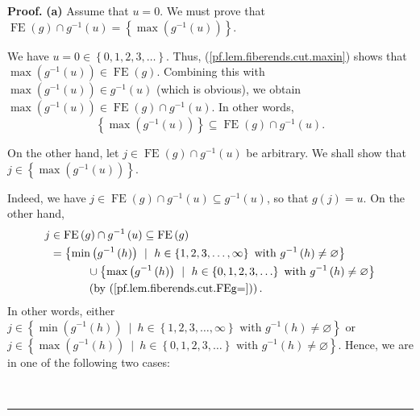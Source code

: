 \documentclass[numbers=enddot,12pt,final,onecolumn,notitlepage]{scrartcl}%
\theoremstyle{definition}
\newenvironment{proof}[1][Proof]{\noindent\textbf{#1.} }{\ \rule{0.5em}{0.5em}}
\newenvironment{verlong}{}{}
\begin{document}
\begin{verlong}
\begin{proof}
\textbf{(a)} Assume that $u=0$. We must prove that $\operatorname*{FE}\left(
g\right)  \cap g^{-1}\left(  u\right)  =\left\{  \max\left(  g^{-1}\left(
u\right)  \right)  \right\}  $.

We have $u=0\in\left\{  0,1,2,3,\ldots\right\}  $. Thus,
(\ref{pf.lem.fiberends.cut.maxin}) shows that $\max\left(  g^{-1}\left(
u\right)  \right)  \in\operatorname*{FE}\left(  g\right)  $. Combining this
with $\max\left(  g^{-1}\left(  u\right)  \right)  \in g^{-1}\left(  u\right)
$ (which is obvious), we obtain $\max\left(  g^{-1}\left(  u\right)  \right)
\in\operatorname*{FE}\left(  g\right)  \cap g^{-1}\left(  u\right)  $. In
other words,%
\begin{equation}
\left\{  \max\left(  g^{-1}\left(  u\right)  \right)  \right\}  \subseteq
\operatorname*{FE}\left(  g\right)  \cap g^{-1}\left(  u\right)  .
\label{pf.lem.fiberends.cut.a.1}%
\end{equation}


On the other hand, let $j\in\operatorname*{FE}\left(  g\right)  \cap
g^{-1}\left(  u\right)  $ be arbitrary. We shall show that $j\in\left\{
\max\left(  g^{-1}\left(  u\right)  \right)  \right\}  $.

Indeed, we have $j\in\operatorname*{FE}\left(  g\right)  \cap g^{-1}\left(
u\right)  \subseteq g^{-1}\left(  u\right)  $, so that $g\left(  j\right)
=u$. On the other hand,%
\begin{align*}
j  &  \in\operatorname*{FE}\left(  g\right)  \cap g^{-1}\left(  u\right)
\subseteq\operatorname*{FE}\left(  g\right) \\
&  =\left\{  \min\left(  g^{-1}\left(  h\right)  \right)  \ \mid\ h\in\left\{
1,2,3,\ldots,\infty\right\}  \text{ with }g^{-1}\left(  h\right)
\neq\varnothing\right\} \\
&  \ \ \ \ \ \ \ \ \ \ \cup\left\{  \max\left(  g^{-1}\left(  h\right)
\right)  \ \mid\ h\in\left\{  0,1,2,3,\ldots\right\}  \text{ with }%
g^{-1}\left(  h\right)  \neq\varnothing\right\} \\
&  \ \ \ \ \ \ \ \ \ \ \left(  \text{by (\ref{pf.lem.fiberends.cut.FEg=}%
)}\right)  .
\end{align*}
In other words, either $j\in\left\{  \min\left(  g^{-1}\left(  h\right)
\right)  \ \mid\ h\in\left\{  1,2,3,\ldots,\infty\right\}  \text{ with }%
g^{-1}\left(  h\right)  \neq\varnothing\right\}  $ or $j\in\left\{
\max\left(  g^{-1}\left(  h\right)  \right)  \ \mid\ h\in\left\{
0,1,2,3,\ldots\right\}  \text{ with }g^{-1}\left(  h\right)  \neq
\varnothing\right\}  $. Hence, we are in one of the following two cases:


\end{proof}
\end{verlong}
\end{document}
